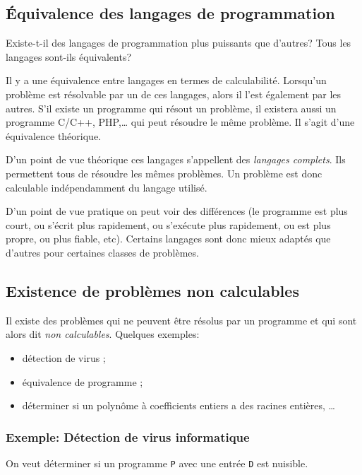 \subsection{Équivalence des langages de programmation}
\label{subsec:equivalence_des_langages_de_programmation}

Existe-t-il des langages de programmation plus puissants que d'autres? Tous les langages sont-ils équivalents?

Il y a une équivalence entre langages en termes de calculabilité.  Lorsqu'un problème est résolvable par un de ces langages, alors il l'est également par les autres.
S'il existe un programme \java qui résout un problème, il existera aussi un programme C/C++, PHP,\ldots{} qui peut résoudre le même problème. Il s'agit d'une équivalence théorique.

D'un point de vue théorique ces langages s'appellent des \emph{langages complets}. Ils permettent tous de résoudre les mêmes problèmes. Un problème est donc calculable indépendamment du langage utilisé.

D'un point de vue pratique on peut voir des différences (le programme est plus court, ou s'écrit plus rapidement, ou s'exécute plus rapidement, ou est plus propre, ou plus fiable, etc). Certains langages sont donc mieux adaptés que d'autres pour certaines classes de problèmes.


\subsection{Existence de problèmes non calculables}
\label{subsec:existence_de_problemes_non_calculables}
	Il existe des problèmes qui ne peuvent être résolus par un programme et qui sont alors dit \emph{non calculables}.
	Quelques exemples:
	\begin{itemize}
		\item détection de virus ;
		\item équivalence de programme ;
		\item déterminer si un polynôme à coefficients entiers a des racines entières, \ldots
	\end{itemize}

\subsubsection{Exemple: Détection de virus informatique}
\label{subsubsec:detection_de_virus_informatique}
On veut déterminer si un programme \lstinline|P| avec une entrée \lstinline|D| est nuisible.

